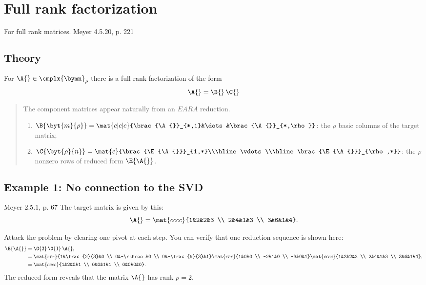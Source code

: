 \section[$\A{}=\B{}\C{}$]{Full rank factorization}
For full rank matrices. Meyer 4.5.20, p. 221

\subsection{Theory}
For $\A{}\in\cmplx{\bymn}_{\rho}$ there is a full rank factorization of the form
\begin{equation}
  \A{}=\B{}\,\C{}
\end{equation}
\begin{quote}
The component matrices appear naturally from an $EARA$ reduction.
\begin{enumerate}
\item $\B{\byt{m}{\rho}} = \mat{c|c|c}{\brac{\A{}}_{*,1}&\dots&\brac{\A{}}_{*,\rho}}$: the $\rho$ basic columns of the target matrix;
\item $\C{\byt{\rho}{n}} = \mat{c}{\brac{\E{\A{}}}_{1,*}\\\hline\vdots\\\hline\brac{\E{\A{}}}_{\rho,*}}$: the $\rho$ nonzero rows of reduced form $\E{\A{}}$.
\end{enumerate}

\end{quote}

\subsection{Example 1: No connection to the SVD}
Meyer 2.5.1, p. 67
The target matrix is given by this:
\begin{equation}
  \A{} = \mat{cccc}{1&2&2&3 \\ 2&4&1&3 \\ 3&6&1&4}.
\end{equation}

Attack the problem by clearing one pivot at each step. You can verify that one reduction sequence is shown here:
\begin{equation}
\begin{split}
  \E{\A{}} &= \G{2}\,\G{1}\,\A{},\\
 & =
\mat{rrr}{1&\frac{2}{3}&0 \\ 0&-\rthree&0 \\ 0&-\frac{5}{3}&1}
\mat{rrr}{1&0&0 \\ -2&1&0 \\ -3&0&1}
\mat{cccc}{1&2&2&3 \\ 2&4&1&3 \\ 3&6&1&4}, \\
   &= 
\mat{cccc}{1&2&0&1 \\ 0&0&1&1 \\ 0&0&0&0}.
\end{split}
\end{equation}
The reduced form reveals that the matrix $\A{}$ has rank $\rho = 2$.

